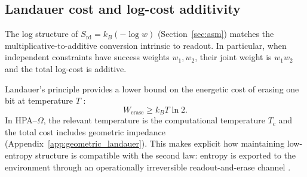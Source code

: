 \subsection{Landauer cost and log-cost additivity}

The log structure of $S_{\mathrm{rd}}=k_B(-\log w)$ (Section~\ref{sec:asm}) matches the multiplicative-to-additive conversion intrinsic to readout. In particular, when independent constraints have success weights $w_1,w_2$, their joint weight is $w_1 w_2$ and the total log-cost is additive.

Landauer's principle provides a lower bound on the energetic cost of erasing one bit at temperature $T$ \cite{Landauer1961,Bennett1973}:
\begin{equation}
W_{\mathrm{erase}} \ge k_B T \ln 2.
\end{equation}
In HPA--$\Omega$, the relevant temperature is the computational temperature $T_c$ and the total cost includes geometric impedance (Appendix~\ref{app:geometric_landauer}). This makes explicit how maintaining low-entropy structure is compatible with the second law: entropy is exported to the environment through an operationally irreversible readout-and-erase channel \cite{Szilard1929,Bennett1989}.


